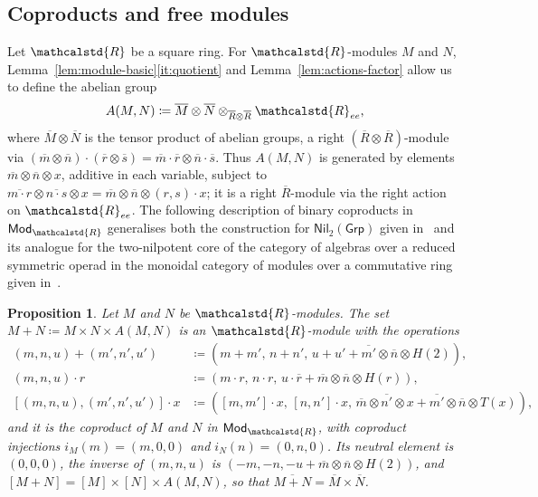 \documentclass[reqno,a4paper]{amsart}
\theoremstyle{plain}
\newtheorem{proposition}[subsection]{Proposition}
\theoremstyle{definition}
\newcommand{\DefEq}{\coloneq}
\newcommand{\R}{\ensuremath{\mathcalstd{R}}}
\newcommand{\Grp}{\ensuremath{\mathsf{Grp}}}
\newcommand{\Mod}{\ensuremath{\mathsf{Mod}}}
\newcommand{\Nil}{\ensuremath{\mathsf{Nil}}}
\newcommand{\Ree}{\ensuremath{\R_{ee}}}
\newcommand{\Rbar}{\ensuremath{\overline{R}}}
\newcommand{\brk}[2]{\ensuremath{[#1,#2]}}
\begin{document}
\subsection{Coproducts and free modules}\label{sec:coproducts}
Let \(\R\) be a square ring. For \(\R\)-modules \(M\) and \(N\), Lemma~\ref{lem:module-basic}\ref{it:quotient} and Lemma~\ref{lem:actions-factor} allow us to define the abelian group
\[
  A(M,N)\DefEq\overline{M}\otimes\overline{N}\otimes_{\Rbar\otimes\Rbar}\Ree\text{,}
\]
where \(\overline{M}\otimes\overline{N}\) is the tensor product of abelian groups, a right \((\Rbar\otimes\Rbar)\)-module via \((\overline{m}\otimes\overline{n})\cdot(\overline{r}\otimes\overline{s})=\overline{m}\cdot\overline{r}\otimes\overline{n}\cdot\overline{s}\). Thus \(A(M,N)\) is generated by elements \(\overline{m}\otimes\overline{n}\otimes x\), additive in each variable, subject to \(\overline{m\cdot r}\otimes\overline{n\cdot s}\otimes x=\overline{m}\otimes\overline{n}\otimes(r,s)\cdot x\); it is a right \(\Rbar\)-module via the right action on \(\Ree\). The following description of binary coproducts in \(\Mod_{\R}\) generalises both the construction for \(\Nil_{2}(\Grp)\) given in~\cite{Jibladze-Pirashvili} and its analogue for the two-nilpotent core of the category of algebras over a reduced symmetric operad in the monoidal category of modules over a commutative ring given in~\cite{DHVdL}.

\begin{proposition}\label{prop:coproduct}
  Let \(M\) and \(N\) be \(\R\)-modules. The set \(M+N\DefEq M\times N\times A(M,N)\) is an \(\R\)-module with the operations
  \begin{align*}
    (m,n,u)+(m',n',u')               & \DefEq(m+m',\,n+n',\,u+u'+\overline{m'}\otimes\overline{n}\otimes H(2))\text{,}                                                                  \\
    (m,n,u)\cdot r                   & \DefEq(m\cdot r,\,n\cdot r,\,u\cdot\overline{r}+\overline{m}\otimes\overline{n}\otimes H(r))\text{,}                                             \\
    \brk{(m,n,u)}{(m',n',u')}\cdot x & \DefEq(\brk{m}{m'}\cdot x,\,\brk{n}{n'}\cdot x,\,\overline{m}\otimes\overline{n'}\otimes x+\overline{m'}\otimes\overline{n}\otimes T(x))\text{,}
  \end{align*}
  and it is the coproduct of \(M\) and \(N\) in \(\Mod_{\R}\), with coproduct injections \(i_{M}(m)=(m,0,0)\) and \(i_{N}(n)=(0,n,0)\). Its neutral element is \((0,0,0)\), the inverse of \((m,n,u)\) is \((-m,-n,-u+\overline{m}\otimes\overline{n}\otimes H(2))\), and \([M+N]=[M]\times[N]\times A(M,N)\), so that \(\overline{M+N}=\overline{M}\times\overline{N}\).
\end{proposition}
\end{document}
